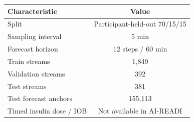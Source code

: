 \begin{tabular}{lc}
\toprule
Characteristic & Value \\
\midrule
Split & Participant-held-out 70/15/15 \\
Sampling interval & 5 min \\
Forecast horizon & 12 steps / 60 min \\
Train streams & 1,849 \\
Validation streams & 392 \\
Test streams & 381 \\
Test forecast anchors & 155,113 \\
Timed insulin dose / IOB & Not available in AI-READI \\
\bottomrule
\end{tabular}
